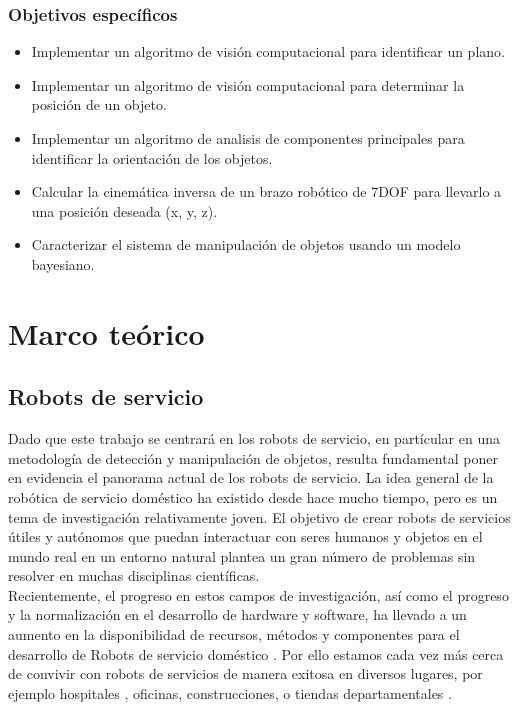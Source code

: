 \documentclass[a4paper, openright, 12pt]{report}
\begin{document}
		\subsection*{Objetivos específicos}
			\begin{itemize}
				\item Implementar un algoritmo de visión computacional para identificar un plano.

				\item Implementar un algoritmo de visión computacional para determinar la posición de un objeto.

				\item Implementar un algoritmo de analisis de componentes principales para identificar la orientación de los objetos.

				\item Calcular la cinemática inversa de un brazo robótico de 7DOF para llevarlo a una posición deseada (x, y, z).

				\item Caracterizar el sistema de manipulación de objetos usando un modelo bayesiano.

			\end{itemize}




\chapter{Marco teórico}
	\section{Robots de servicio}


		Dado que este trabajo se centrará en los robots de servicio, en partícular en una metodología de detección y manipulación de objetos, resulta fundamental poner en evidencia el panorama actual de los robots de servicio. La idea general de la robótica de servicio doméstico ha existido desde hace mucho tiempo, pero es un tema de investigación relativamente joven. El objetivo de crear robots de servicios útiles y autónomos que puedan interactuar con seres humanos y objetos en el mundo real en un entorno natural plantea un gran número de problemas sin resolver en muchas disciplinas científicas.\\

		Recientemente, el progreso en estos campos de investigación, así como el progreso y la normalización en el desarrollo de hardware y software, ha llevado a un aumento en la disponibilidad de recursos, métodos y componentes para el desarrollo  de Robots de servicio doméstico . Por ello estamos cada vez más cerca de convivir con robots de servicios de manera exitosa en diversos lugares, por ejemplo hospitales \cite{hospitalRobots}, oficinas, construcciones, o tiendas departamentales \cite{robotsInStores}.\\
\end{document}
